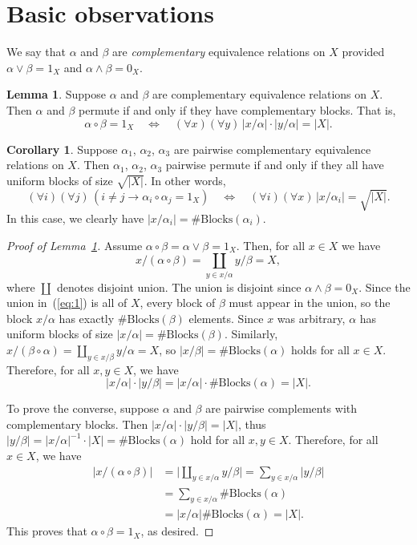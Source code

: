 \documentclass{amsart}
\theoremstyle{plain}
\theoremstyle{definition}
\newtheorem{corollary}{Corollary}
\newtheorem{lemma}{Lemma}
\theoremstyle{definition}
\numberwithin{equation}{section}
\newcommand{\<}{\ensuremath{\langle}}
\renewcommand{\>}{\ensuremath{\rangle}}
\newcommand{\meet}{\ensuremath{\wedge}}
\newcommand{\join}{\ensuremath{\vee}}
\newcommand{\nb}[1]{\ensuremath{\#\mathrm{Blocks}(#1)}}
\begin{document}
\section{Basic observations}
We say that $\alpha$ and $\beta$ are \emph{complementary} equivalence relations
on $X$ provided $\alpha \join \beta = 1_X$ and $\alpha \meet \beta = 0_X$.
\begin{lemma}
\label{lem:1}
Suppose $\alpha$ and $\beta$ are complementary equivalence relations on
$X$. Then $\alpha$ and $\beta$ permute if and only if they have complementary
blocks.  That is,
\[
\alpha \circ \beta =1_X \quad \Longleftrightarrow \quad (\forall x)(\forall y)\,
|x/\alpha|\cdot |y/\alpha| = |X|.
\]
\end{lemma}
\begin{corollary}
\label{cor:1}
Suppose $\alpha_1$, $\alpha_2$, $\alpha_3$ are pairwise complementary
equivalence relations on $X$. Then  $\alpha_1$, $\alpha_2$, $\alpha_3$
pairwise permute if and only if they all have uniform blocks of size 
$\sqrt{|X|}$.  In other words,
\[
(\forall i)(\forall j) \, (i\neq j \longrightarrow \alpha_i \circ \alpha_j = 1_X)
\quad \Longleftrightarrow \quad (\forall i)(\forall x) \, |x/\alpha_i| =
\sqrt{|X|}.
\]
In this case, we clearly have $|x/\alpha_i| =\nb{\alpha_i}$. 
\end{corollary}
\begin{proof}[Proof of Lemma~\ref{lem:1}]
  Assume $\alpha \circ \beta = \alpha \join \beta = 1_X$. Then, for all $x\in X$
  we have
  \begin{equation}
    \label{eq:1}
x/(\alpha\circ \beta) = \coprod_{y \in x/\alpha} y/\beta = X,
  \end{equation}
where $\coprod$ denotes disjoint union.  The union is disjoint since
$\alpha \meet \beta = 0_X$.  Since the union in~(\ref{eq:1}) is all of $X$,
every block of $\beta$ must appear in the union, so the block $x/\alpha$ has
exactly $\nb{\beta}$ elements. Since $x$ was arbitrary, $\alpha$ has uniform
blocks of size $|x/\alpha| =\nb{\beta}$. Similarly, 
$x/(\beta \circ \alpha) = \coprod_{y \in x/\beta} y/\alpha = X$, so 
$|x/\beta| =\nb{\alpha}$ holds for all $x\in X$.  Therefore, 
for all $x, y\in X$, we have
\[
|x/\alpha|\cdot |y/\beta| 
 = |x/\alpha|\cdot \nb{\alpha} = |X|.
\]

To prove the converse, suppose $\alpha$ and $\beta$ are pairwise complements
with complementary blocks.  Then $|x/\alpha|\cdot |y/\beta| = |X|$, 
thus $|y/\beta| = |x/\alpha|^{-1} \cdot |X|  = \nb{\alpha}$ 
hold for all $x, y \in X$.  Therefore, for all $x\in X$, we have
\begin{align*}
\bigl|x/(\alpha\circ \beta)\bigr| &= \bigl|\coprod_{y\in x/\alpha} y/\beta\bigr|
= \sum_{y \in x/\alpha} |y/\beta|\\
&= \sum_{y \in x/\alpha} \nb{\alpha} \\
&= |x/\alpha|\nb{\alpha} = |X|.
\end{align*}
This proves that $\alpha\circ \beta = 1_X$, as desired.
\end{proof}
\end{document}
